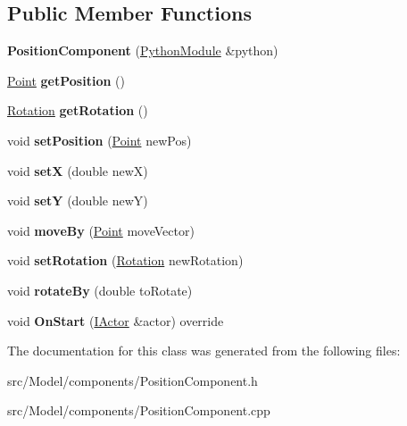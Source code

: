 \subsection*{Public Member Functions}
\begin{DoxyCompactItemize}
\item 
{\bfseries Position\+Component} (\hyperlink{classPythonModule}{Python\+Module} \&python)\hypertarget{classPositionComponent_aefecf74377b672e2c4ff0562b5503b2e}{}\label{classPositionComponent_aefecf74377b672e2c4ff0562b5503b2e}

\item 
\hyperlink{classPoint}{Point} {\bfseries get\+Position} ()\hypertarget{classPositionComponent_accdb09e8b82b55683728539f4e85c30e}{}\label{classPositionComponent_accdb09e8b82b55683728539f4e85c30e}

\item 
\hyperlink{classRotation}{Rotation} {\bfseries get\+Rotation} ()\hypertarget{classPositionComponent_a304dc08e538b164e55d07559c44a11b6}{}\label{classPositionComponent_a304dc08e538b164e55d07559c44a11b6}

\item 
void {\bfseries set\+Position} (\hyperlink{classPoint}{Point} new\+Pos)\hypertarget{classPositionComponent_a60cdd7e7f58f4191786f8decb91321bb}{}\label{classPositionComponent_a60cdd7e7f58f4191786f8decb91321bb}

\item 
void {\bfseries setX} (double newX)\hypertarget{classPositionComponent_aa90f5ae0793a8ad7b06bcd1942e0fcda}{}\label{classPositionComponent_aa90f5ae0793a8ad7b06bcd1942e0fcda}

\item 
void {\bfseries setY} (double newY)\hypertarget{classPositionComponent_a896ccb0917a11a7b71f560f6abd3445f}{}\label{classPositionComponent_a896ccb0917a11a7b71f560f6abd3445f}

\item 
void {\bfseries move\+By} (\hyperlink{classPoint}{Point} move\+Vector)\hypertarget{classPositionComponent_aa47844321e405f53679ca608a4c8ca6f}{}\label{classPositionComponent_aa47844321e405f53679ca608a4c8ca6f}

\item 
void {\bfseries set\+Rotation} (\hyperlink{classRotation}{Rotation} new\+Rotation)\hypertarget{classPositionComponent_a448985969e39873e5d3494cb6e0e4e84}{}\label{classPositionComponent_a448985969e39873e5d3494cb6e0e4e84}

\item 
void {\bfseries rotate\+By} (double to\+Rotate)\hypertarget{classPositionComponent_a6883b4e5ee629a241d22e7fa2488f817}{}\label{classPositionComponent_a6883b4e5ee629a241d22e7fa2488f817}

\item 
void {\bfseries On\+Start} (\hyperlink{classIActor}{I\+Actor} \&actor) override\hypertarget{classPositionComponent_a11ff60252a9c65de2d0ee02901604d4b}{}\label{classPositionComponent_a11ff60252a9c65de2d0ee02901604d4b}

\end{DoxyCompactItemize}


The documentation for this class was generated from the following files\+:\begin{DoxyCompactItemize}
\item 
src/\+Model/components/Position\+Component.\+h\item 
src/\+Model/components/Position\+Component.\+cpp\end{DoxyCompactItemize}
